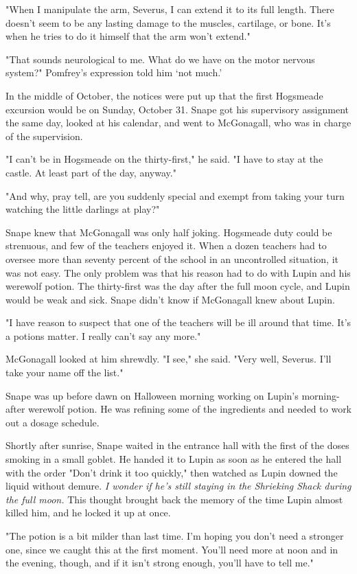 "When I manipulate the arm, Severus, I can extend it to its full length. There doesn't seem to be any lasting damage to the muscles, cartilage, or bone. It's when he tries to do it himself that the arm won't extend."

"That sounds neurological to me. What do we have on the motor nervous system?" Pomfrey's expression told him `not much.'

In the middle of October, the notices were put up that the first Hogsmeade excursion would be on Sunday, October 31. Snape got his supervisory assignment the same day, looked at his calendar, and went to McGonagall, who was in charge of the supervision.

"I can't be in Hogsmeade on the thirty-first," he said. "I have to stay at the castle. At least part of the day, anyway."

"And why, pray tell, are you suddenly special and exempt from taking your turn watching the little darlings at play?"

Snape knew that McGonagall was only half joking. Hogsmeade duty could be strenuous, and few of the teachers enjoyed it. When a dozen teachers had to oversee more than seventy percent of the school in an uncontrolled situation, it was not easy. The only problem was that his reason had to do with Lupin and his werewolf potion. The thirty-first was the day after the full moon cycle, and Lupin would be weak and sick. Snape didn't know if McGonagall knew about Lupin.

"I have reason to suspect that one of the teachers will be ill around that time. It's a potions matter. I really can't say any more."

McGonagall looked at him shrewdly. "I see," she said. "Very well, Severus. I'll take your name off the list."

Snape was up before dawn on Halloween morning working on Lupin's morning-after werewolf potion. He was refining some of the ingredients and needed to work out a dosage schedule.

Shortly after sunrise, Snape waited in the entrance hall with the first of the doses smoking in a small goblet. He handed it to Lupin as soon as he entered the hall with the order "Don't drink it too quickly," then watched as Lupin downed the liquid without demure. \emph{I wonder if he's still staying in the Shrieking Shack during the full moon.} This thought brought back the memory of the time Lupin almost killed him, and he locked it up at once.

"The potion is a bit milder than last time. I'm hoping you don't need a stronger one, since we caught this at the first moment. You'll need more at noon and in the evening, though, and if it isn't strong enough, you'll have to tell me."

